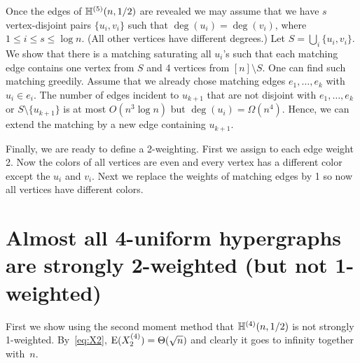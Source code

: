 \documentclass[12pt,reqno]{amsart}
\begin{document}
Once the edges of $\mathbb{H}^{({5})}(n,1/2)$ are revealed we may assume that we have $s$ vertex-disjoint pairs $\{u_i,v_i\}$ such that $\deg(u_i)=\deg(v_i)$, where $1\le i\le s\le \log n$. (All other vertices have different degrees.) Let $S=\bigcup_i\{u_i,v_i\}$. We show that 
there is a matching saturating all $u_i$'s such that each matching edge contains one vertex from $S$ and 4 vertices from $[n]\setminus S$. One can find such matching greedily. Assume that we already chose matching edges $e_1,\dots,e_k$ with $u_i\in e_i$. The number of edges incident to $u_{k+1}$ that are not disjoint with $e_1,\dots,e_k$ or $S\setminus\{u_{k+1}\}$ is at most $O(n^3\log n)$ but $\deg(u_i)=\Omega(n^4)$. Hence, we can extend the matching by a new edge containing $u_{k+1}$.

Finally, we are ready to define a 2-weighting. First we assign to each edge weight 2. Now the colors of all vertices are even and every vertex has a different color except the $u_i$ and $v_i$. Next we replace the weights of matching edges by 1 so now all vertices have different colors.

\section{Almost all 4-uniform hypergraphs are strongly 2-weighted (but not 1-weighted)}\label{sec:thm2:ia}

First we show using the second moment method that \whp $\mathbb{H}^{({4})}(n,1/2)$ is not strongly 1-weighted. By~\eqref{eq:X2}, $\mathrm{E}(X_2^{(4)}) = \Theta(\sqrt{n})$
and clearly it goes to infinity together with~$n$. 
\end{document}
